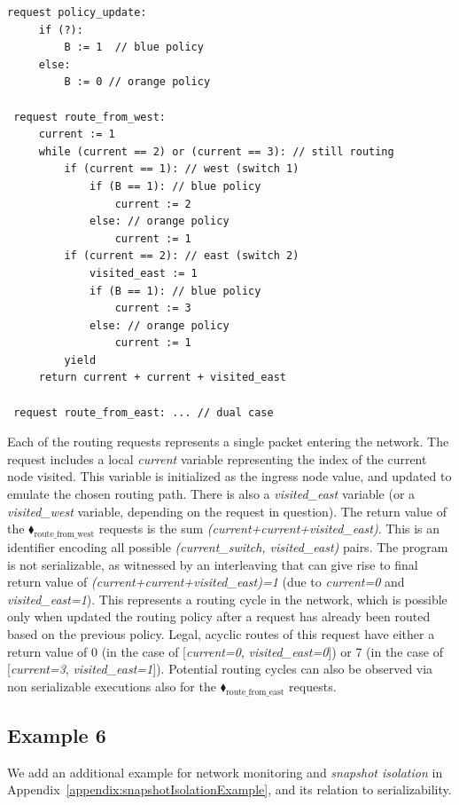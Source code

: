 \begin{center}
\begin{minipage}[!htbp]{0.85\textwidth}
	\begin{lstlisting}[caption={BGP (non serializable --- cycles can appear)},label={lst:BgpNonSerializable}]
 request policy_update:
     if (?):
         B := 1  // blue policy 
     else:
         B := 0 // orange policy
		
 request route_from_west:
     current := 1
     while (current == 2) or (current == 3): // still routing        
         if (current == 1): // west (switch 1)
             if (B == 1): // blue policy
                 current := 2
             else: // orange policy
                 current := 1
         if (current == 2): // east (switch 2)
             visited_east := 1
             if (B == 1): // blue policy
                 current := 3
             else: // orange policy
                 current := 1
         yield
     return current + current + visited_east
     
 request route_from_east: ... // dual case      
		\end{lstlisting}
\end{minipage}
\end{center}


Each of the routing requests represents a single packet entering the network. The request includes a local \textit{current} variable representing the index of the current node visited. This variable is initialized as the ingress node value, and updated to emulate the chosen routing path. There is also a \textit{visited\_east} variable (or a \textit{visited\_west} variable, depending on the request in question).
%
The return value of the {\color{ForestGreen}$\blacklozenge_\text{route\_from\_west}$} requests is the sum \textit{(current+current+visited\_east)}. This is an identifier encoding all possible \textit{(current\_switch, visited\_east)} pairs.
%
The program is not serializable, as witnessed by an interleaving that can give rise to final return value of \textit{(current+current+visited\_east)=1} (due to \textit{current=0} and \textit{visited\_east=1}). This represents a routing cycle in the network, which is possible only when updated the routing policy after a request has already been routed based on the previous policy.
Legal, acyclic routes of this request have either a return value of 0 (in the case of [\textit{current=0}, \textit{visited\_east=0}]) or 7 (in the case of [\textit{current=3}, \textit{visited\_east=1}]).
Potential routing cycles can also be observed via non serializable executions also for the  {\color{ForestGreen}$\blacklozenge_\text{route\_from\_east}$} requests.


\subsection{Example 6}

We add an additional example for network monitoring and \textit{snapshot isolation} in Appendix~\ref{appendix:snapshotIsolationExample}, and its relation to serializability.




